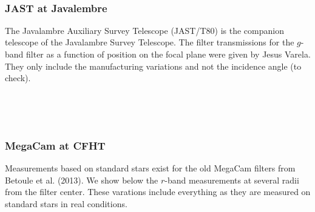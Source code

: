 \documentclass{article}
\begin{document}
    \begin{center}
    \end{center}
    { \hspace*{\fill} \\}
    
    \hypertarget{jast-at-javalembre}{%
\subsubsection{JAST at Javalembre}\label{jast-at-javalembre}}

The Javalambre Auxiliary Survey Telescope (JAST/T80) is the companion
telescope of the Javalambre Survey Telescope. The filter transmissions
for the \(g\)-band filter as a function of position on the focal plane
were given by Jesus Varela. They only include the manufacturing
variations and not the incidence angle (to check).


    \begin{center}
    \end{center}
    { \hspace*{\fill} \\}
    
    \begin{center}
    \end{center}
    { \hspace*{\fill} \\}
    
    \hypertarget{megacam-at-cfht}{%
\subsubsection{MegaCam at CFHT}\label{megacam-at-cfht}}

Measurements based on standard stars exist for the old MegaCam filters
from Betoule et al. (2013). We show below the \(r\)-band measurements at
several radii from the filter center. These varations include everything
as they are measured on standard stars in real conditions.


    \begin{center}
    \end{center}
    { \hspace*{\fill} \\}
    
\end{document}

